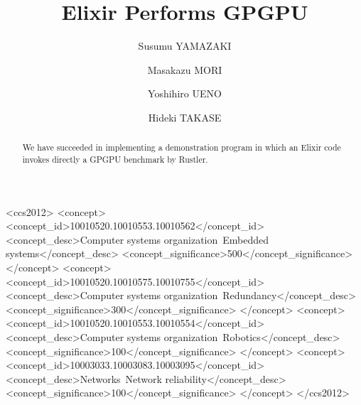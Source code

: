 \documentclass[sigplan]{acmart}
\begin{document}
\title{Elixir Performs GPGPU}

\author{Susumu YAMAZAKI}

\author{Masakazu MORI}

\author{Yoshihiro UENO}

\author{Hideki TAKASE}


\renewcommand{\shortauthors}{S. Yamazaki et al.}


\begin{abstract}
We have succeeded in implementing a demonstration program in which an Elixir code invokes directly a GPGPU benchmark by Rustler. 
\end{abstract}

%
%
\begin{CCSXML}
<ccs2012>
 <concept>
  <concept_id>10010520.10010553.10010562</concept_id>
  <concept_desc>Computer systems organization~Embedded systems</concept_desc>
  <concept_significance>500</concept_significance>
 </concept>
 <concept>
  <concept_id>10010520.10010575.10010755</concept_id>
  <concept_desc>Computer systems organization~Redundancy</concept_desc>
  <concept_significance>300</concept_significance>
 </concept>
 <concept>
  <concept_id>10010520.10010553.10010554</concept_id>
  <concept_desc>Computer systems organization~Robotics</concept_desc>
  <concept_significance>100</concept_significance>
 </concept>
 <concept>
  <concept_id>10003033.10003083.10003095</concept_id>
  <concept_desc>Networks~Network reliability</concept_desc>
  <concept_significance>100</concept_significance>
 </concept>
</ccs2012>
\end{CCSXML}
\end{document}
